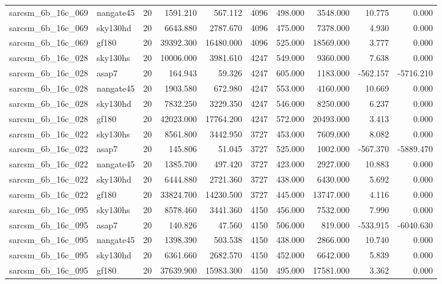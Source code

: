 \documentclass{article}
\begin{document}
\begin{longtable}{llrrrrrrrr}
sarcsm\_6b\_16c\_069 & nangate45 & 20 & 1591.210 & 567.112 & 4096 & 498.000 & 3548.000 & 10.775 & 0.000 \\
sarcsm\_6b\_16c\_069 & sky130hd & 20 & 6643.880 & 2787.670 & 4096 & 475.000 & 7378.000 & 4.930 & 0.000 \\
sarcsm\_6b\_16c\_069 & gf180 & 20 & 39392.300 & 16480.000 & 4096 & 525.000 & 18569.000 & 3.777 & 0.000 \\
sarcsm\_6b\_16c\_028 & sky130hs & 20 & 10006.000 & 3981.610 & 4247 & 549.000 & 9360.000 & 7.638 & 0.000 \\
sarcsm\_6b\_16c\_028 & asap7 & 20 & 164.943 & 59.326 & 4247 & 605.000 & 1183.000 & -562.157 & -5716.210 \\
sarcsm\_6b\_16c\_028 & nangate45 & 20 & 1903.580 & 672.980 & 4247 & 553.000 & 4160.000 & 10.669 & 0.000 \\
sarcsm\_6b\_16c\_028 & sky130hd & 20 & 7832.250 & 3229.350 & 4247 & 546.000 & 8250.000 & 6.237 & 0.000 \\
sarcsm\_6b\_16c\_028 & gf180 & 20 & 42023.000 & 17764.200 & 4247 & 572.000 & 20493.000 & 3.413 & 0.000 \\
sarcsm\_6b\_16c\_022 & sky130hs & 20 & 8561.800 & 3442.950 & 3727 & 453.000 & 7609.000 & 8.082 & 0.000 \\
sarcsm\_6b\_16c\_022 & asap7 & 20 & 145.806 & 51.045 & 3727 & 525.000 & 1002.000 & -567.370 & -5889.470 \\
sarcsm\_6b\_16c\_022 & nangate45 & 20 & 1385.700 & 497.420 & 3727 & 423.000 & 2927.000 & 10.883 & 0.000 \\
sarcsm\_6b\_16c\_022 & sky130hd & 20 & 6444.880 & 2721.360 & 3727 & 438.000 & 6430.000 & 5.692 & 0.000 \\
sarcsm\_6b\_16c\_022 & gf180 & 20 & 33824.700 & 14230.500 & 3727 & 445.000 & 13747.000 & 4.116 & 0.000 \\
sarcsm\_6b\_16c\_095 & sky130hs & 20 & 8578.460 & 3441.360 & 4150 & 456.000 & 7532.000 & 7.990 & 0.000 \\
sarcsm\_6b\_16c\_095 & asap7 & 20 & 140.826 & 47.560 & 4150 & 506.000 & 819.000 & -533.915 & -6040.630 \\
sarcsm\_6b\_16c\_095 & nangate45 & 20 & 1398.390 & 503.538 & 4150 & 438.000 & 2866.000 & 10.740 & 0.000 \\
sarcsm\_6b\_16c\_095 & sky130hd & 20 & 6361.660 & 2682.570 & 4150 & 452.000 & 6642.000 & 5.839 & 0.000 \\
sarcsm\_6b\_16c\_095 & gf180 & 20 & 37639.900 & 15983.300 & 4150 & 495.000 & 17581.000 & 3.362 & 0.000 \\

\end{longtable}
\end{document}
